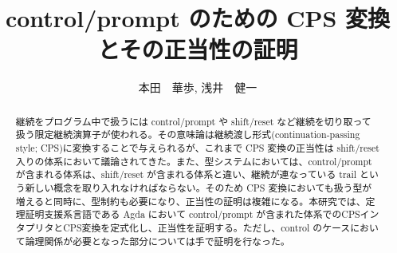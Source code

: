 \documentclass[japanese,draft]{jssst_ppl} %
\title{control/prompt のための CPS 変換とその正当性の証明}
\author{本田　華歩, 浅井　健一}
\begin{document}
\maketitle
\begin{abstract}
継続をプログラム中で扱うには control/prompt や shift/reset など継続を切り取って扱う限定継続演算子が使われる。その意味論は継続渡し形式(continuation-passing style; CPS)に変換することで与えられるが、これまで CPS 変換の正当性は shift/reset 入りの体系において議論されてきた。また、型システムにおいては、control/prompt が含まれる体系は、shift/reset が含まれる体系と違い、継続が連なっている trail という新しい概念を取り入れなければならない。そのため CPS 変換においても扱う型が増えると同時に、型制約も必要になり、正当性の証明は複雑になる。本研究では、定理証明支援系言語である Agda において control/prompt が含まれた体系でのCPSインタプリタとCPS変換を定式化し、正当性を証明する。ただし、control のケースにおいて論理関係が必要となった部分については手で証明を行なった。
\end{abstract}














\newpage


\end{document}
